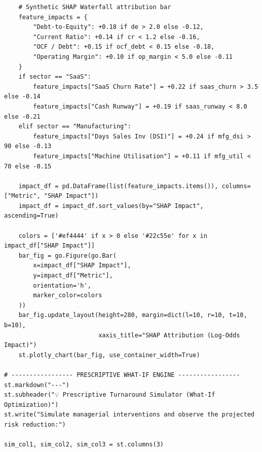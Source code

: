 \documentclass[11pt, a4paper]{article}
\begin{document}
\begin{verbatim}
    # Synthetic SHAP Waterfall attribution bar
    feature_impacts = {
        "Debt-to-Equity": +0.18 if de > 2.0 else -0.12,
        "Current Ratio": +0.14 if cr < 1.2 else -0.16,
        "OCF / Debt": +0.15 if ocf_debt < 0.15 else -0.18,
        "Operating Margin": +0.10 if op_margin < 5.0 else -0.11
    }
    if sector == "SaaS":
        feature_impacts["SaaS Churn Rate"] = +0.22 if saas_churn > 3.5 else -0.14
        feature_impacts["Cash Runway"] = +0.19 if saas_runway < 8.0 else -0.21
    elif sector == "Manufacturing":
        feature_impacts["Days Sales Inv (DSI)"] = +0.24 if mfg_dsi > 90 else -0.13
        feature_impacts["Machine Utilisation"] = +0.11 if mfg_util < 70 else -0.15
        
    impact_df = pd.DataFrame(list(feature_impacts.items()), columns=["Metric", "SHAP Impact"])
    impact_df = impact_df.sort_values(by="SHAP Impact", ascending=True)
    
    colors = ['#ef4444' if x > 0 else '#22c55e' for x in impact_df["SHAP Impact"]]
    bar_fig = go.Figure(go.Bar(
        x=impact_df["SHAP Impact"],
        y=impact_df["Metric"],
        orientation='h',
        marker_color=colors
    ))
    bar_fig.update_layout(height=280, margin=dict(l=10, r=10, t=10, b=10),
                          xaxis_title="SHAP Attribution (Log-Odds Impact)")
    st.plotly_chart(bar_fig, use_container_width=True)

# ----------------- PRESCRIPTIVE WHAT-IF ENGINE -----------------
st.markdown("---")
st.subheader("💡 Prescriptive Turnaround Simulator (What-If Optimization)")
st.write("Simulate managerial interventions and observe the projected risk reduction:")

sim_col1, sim_col2, sim_col3 = st.columns(3)


\end{verbatim}
\end{document}
